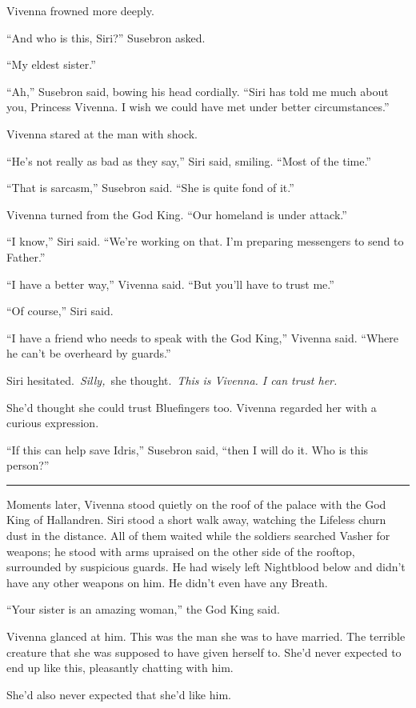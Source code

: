 Vivenna frowned more deeply.

“And who is this, Siri?” Susebron asked.

“My eldest sister.”

“Ah,” Susebron said, bowing his head cordially. “Siri has told me much about you, Princess Vivenna. I wish we could have met under better circumstances.”

Vivenna stared at the man with shock.

“He’s not really as bad as they say,” Siri said, smiling. “Most of the time.”

“That is sarcasm,” Susebron said. “She is quite fond of it.”

Vivenna turned from the God King. “Our homeland is under attack.”

“I know,” Siri said. “We’re working on that. I’m preparing messengers to send to Father.”

“I have a better way,” Vivenna said. “But you’ll have to trust me.”

“Of course,” Siri said.

“I have a friend who needs to speak with the God King,” Vivenna said. “Where he can’t be overheard by guards.”

Siri hesitated.~\textit{Silly,}~she thought.~\textit{This is Vivenna. I can trust her.}

She’d thought she could trust Bluefingers too. Vivenna regarded her with a curious expression.

“If this can help save Idris,” Susebron said, “then I will do it. Who is this person?”

\bigskip \hrule \bigskip

Moments later, Vivenna stood quietly on the roof of the palace with the God King of Hallandren. Siri stood a short walk away, watching the Lifeless churn dust in the distance. All of them waited while the soldiers searched Vasher for weapons; he stood with arms upraised on the other side of the rooftop, surrounded by suspicious guards. He had wisely left Nightblood below and didn’t have any other weapons on him. He didn’t even have any Breath.

“Your sister is an amazing woman,” the God King said.

Vivenna glanced at him. This was the man she was to have married. The terrible creature that she was supposed to have given herself to. She’d never expected to end up like this, pleasantly chatting with him.

She’d also never expected that she’d like him.

